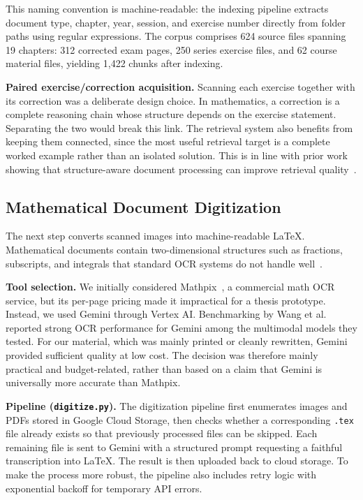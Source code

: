 This naming convention is machine-readable: the indexing pipeline extracts
document type, chapter, year, session, and exercise number directly from
folder paths using regular expressions. The corpus comprises 624 source
files spanning 19 chapters: 312 corrected exam pages, 250 series exercise
files, and 62 course material files, yielding 1{,}422 chunks after indexing.

\textbf{Paired exercise/correction acquisition.} Scanning each exercise
together with its correction was a deliberate design choice. In mathematics,
a correction is a complete reasoning chain whose structure depends on the
exercise statement. Separating the two would break this link. The retrieval
system also benefits from keeping them connected, since the most useful
retrieval target is a complete worked example rather than an isolated
solution. This is in line with prior work showing that structure-aware
document processing can improve retrieval
quality~\cite{zhao2024financial_chunking, chen2024mog}.

\subsection{Mathematical Document Digitization}
\label{sec:digitization}

The next step converts scanned images into machine-readable \LaTeX{}.
Mathematical documents contain two-dimensional structures such as fractions,
subscripts, and integrals that standard OCR systems do not handle
well~\cite{wang2023ocrbench, mahdavi2019icdar_math}.

\textbf{Tool selection.} We initially considered
Mathpix~\cite{mathpix2024}, a commercial math OCR service, but its per-page
pricing made it impractical for a thesis prototype. Instead, we used Gemini
through Vertex AI. Benchmarking by Wang et al.~\cite{wang2023ocrbench}
reported strong OCR performance for Gemini among the multimodal models they
tested. For our material, which was mainly printed or cleanly rewritten,
Gemini provided sufficient quality at low cost. The decision was therefore
mainly practical and budget-related, rather than based on a claim that
Gemini is universally more accurate than Mathpix.

\textbf{Pipeline (\texttt{digitize.py}).} The digitization pipeline first
enumerates images and PDFs stored in Google Cloud Storage, then checks
whether a corresponding \texttt{.tex} file already exists so that previously
processed files can be skipped. Each remaining file is sent to Gemini with a
structured prompt requesting a faithful transcription into \LaTeX{}. The
result is then uploaded back to cloud storage. To make the process more
robust, the pipeline also includes retry logic with exponential backoff for
temporary API errors.

